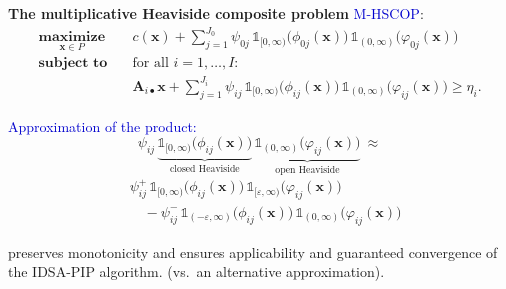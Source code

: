 \documentclass[aspectratio=169,xcolor=dvipsnames]{beamer}
\begin{document}
\begin{frame}
  \footnotesize
  \setlength{\abovedisplayskip}{4pt}
  \setlength{\belowdisplayskip}{4pt}

  \textbf{The multiplicative Heaviside composite problem}
  \textcolor{MediumBlue}{M-HSCOP}:
  \[
    \begin{aligned}
      \operatorname*{\textbf{maximize}}_{\mathbf{x}\in P}\quad
      &c(\mathbf{x})+\sum_{j=1}^{J_0}\psi_{0j}\,
        \mathds{1}_{[0,\infty)}\bigl(\phi_{0j}(\mathbf{x})\bigr)\,
        \mathds{1}_{(0,\infty)}\bigl(\varphi_{0j}(\mathbf{x})\bigr)\\[2pt]
      \operatorname*{\textbf{subject to}}\quad
      &\text{for all }i=1,\ldots,I:\\[2pt]
      &\mathbf{A}_{i\bullet}\mathbf{x}+\sum_{j=1}^{J_i}\psi_{ij}\,
        \mathds{1}_{[0,\infty)}\bigl(\phi_{ij}(\mathbf{x})\bigr)\,
        \mathds{1}_{(0,\infty)}\bigl(\varphi_{ij}(\mathbf{x})\bigr)\geq\eta_i.
    \end{aligned}
  \]

  \vspace{0.04cm}
  \textcolor{MediumBlue}{Approximation of the product:}
  \[
    \psi_{ij}\,
      \underbrace{\mathds{1}_{[0,\infty)}\bigl(\phi_{ij}(\mathbf{x})\bigr)}_{
        \text{closed Heaviside}}\,
      \underbrace{\mathds{1}_{(0,\infty)}\bigl(\varphi_{ij}(\mathbf{x})\bigr)}_{
        \text{open Heaviside}}\ \approx
  \]
  \vspace{-0.30cm}
  \[
    \begin{aligned}
      &\psi^+_{ij}\,\mathds{1}_{[0,\infty)}\bigl(\phi_{ij}(\mathbf{x})\bigr)\,
        \mathds{1}_{[\varepsilon,\infty)}\bigl(\varphi_{ij}(\mathbf{x})\bigr)\\
      &\quad{}-\psi^-_{ij}\,\mathds{1}_{(-\varepsilon,\infty)}
        \bigl(\phi_{ij}(\mathbf{x})\bigr)\,
        \mathds{1}_{(0,\infty)}\bigl(\varphi_{ij}(\mathbf{x})\bigr)
    \end{aligned}
  \]

  \vspace{0.02cm}
  preserves monotonicity and ensures applicability and guaranteed convergence of
  the IDSA-PIP algorithm. (vs.\ an alternative approximation).
\end{frame}
\end{document}
